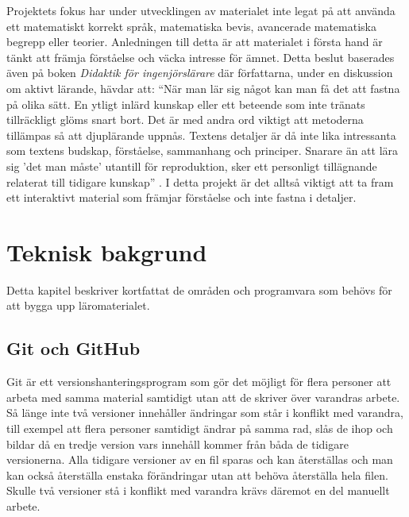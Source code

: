 \documentclass[12pt,a4paper,twoside,openright]{article}
\begin{document}
Projektets fokus har under utvecklingen av materialet inte legat på
att använda ett matematiskt korrekt språk, matematiska bevis,
avancerade matematiska begrepp eller teorier. Anledningen till detta
är att materialet i första hand är tänkt att främja förståelse och
väcka intresse för ämnet. Detta beslut baserades även på boken
\textit{Didaktik för ingenjörslärare} där författarna, under en
diskussion om aktivt lärande, hävdar att: ``När man lär sig något kan
man få det att fastna på olika sätt. En ytligt inlärd kunskap eller
ett beteende som inte tränats tillräckligt glöms snart bort. Det är
med andra ord viktigt att metoderna tillämpas så att djuplärande
uppnås. Textens detaljer är då inte lika intressanta som textens
budskap, förståelse, sammanhang och principer. Snarare än att lära sig
'det man måste' utantill för reproduktion, sker ett personligt
tillägnande relaterat till tidigare kunskap''
\cite{didaktik_for_ingenjorslarare}. I detta projekt är det alltså
viktigt att ta fram ett interaktivt material som främjar förståelse
och inte fastna i detaljer.

\newpage

\section{Teknisk bakgrund}
Detta kapitel beskriver kortfattat de områden och programvara som
behövs för att bygga upp läromaterialet.


\subsection{Git och GitHub}
\gls{Git} är ett versionshanteringsprogram som gör det möjligt för flera
personer att arbeta med samma material samtidigt utan att de skriver
över varandras arbete. Så länge inte två versioner innehåller
ändringar som står i konflikt med varandra, till exempel att flera
personer samtidigt ändrar på samma rad, slås de ihop och bildar då en
tredje version vars innehåll kommer från båda de tidigare
versionerna. Alla tidigare versioner av en fil sparas och kan
återställas och man kan också återställa enstaka förändringar utan att
behöva återställa hela filen. Skulle två versioner stå i konflikt med
varandra krävs däremot en del manuellt arbete.
\end{document}
